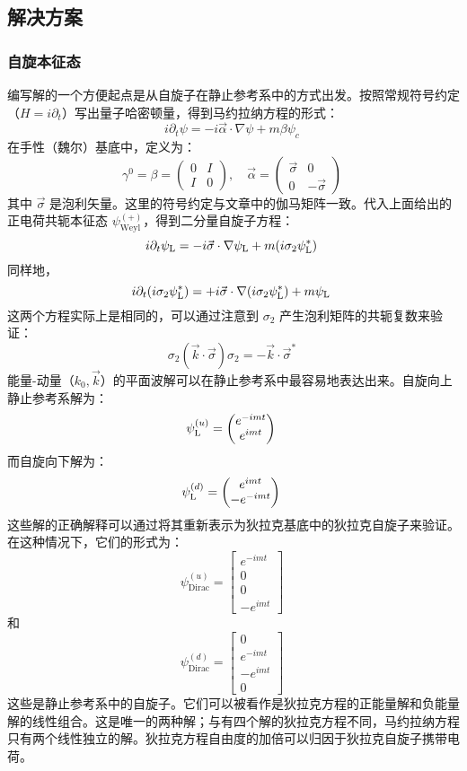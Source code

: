 \subsection{解决方案}  
\subsubsection{自旋本征态}  
编写解的一个方便起点是从自旋子在静止参考系中的方式出发。按照常规符号约定（\( H = i \partial_t \)）写出量子哈密顿量，得到马约拉纳方程的形式：
\[
i \partial_t \psi = -i \vec{\alpha} \cdot \nabla \psi + m \beta \psi_c~
\]
在手性（魏尔）基底中，定义为：
\[
\gamma^0 = \beta = \begin{pmatrix} 0 & I \\ I & 0 \end{pmatrix}, \quad \vec{\alpha} = \begin{pmatrix} \vec{\sigma} & 0 \\ 0 & -\vec{\sigma} \end{pmatrix}~
\]
其中 \(\vec{\sigma}\) 是泡利矢量。这里的符号约定与文章中的伽马矩阵一致。代入上面给出的正电荷共轭本征态 \( \psi_{\text{Weyl}}^{(+)} \)，得到二分量自旋子方程：
\[
i \partial_t \psi_{\rm L} = -i \vec{\sigma} \cdot \nabla \psi_{\rm L} + m (i \sigma_2 \psi_{\rm L}^*)~
\]
同样地，
\[
i \partial_t (i \sigma_2 \psi_{\rm L}^*) = +i \vec{\sigma} \cdot \nabla (i \sigma_2 \psi_{\rm L}^*) + m \psi_{\rm L}~
\]
这两个方程实际上是相同的，可以通过注意到 \( \sigma_2 \) 产生泡利矩阵的共轭复数来验证：
\[
\sigma_2 (\vec{k} \cdot \vec{\sigma}) \sigma_2 = -\vec{k} \cdot \vec{\sigma}^*~
\]
能量-动量（\(k_0, \vec{k}\)）的平面波解可以在静止参考系中最容易地表达出来。自旋向上静止参考系解为：
\[
\psi_{\rm L}^{(u)} = \begin{pmatrix} e^{-imt} \\ e^{imt} \end{pmatrix}~
\]
而自旋向下解为：
\[
\psi_{\rm L}^{(d)} = \begin{pmatrix} e^{imt} \\ -e^{-imt} \end{pmatrix}~
\]
这些解的正确解释可以通过将其重新表示为狄拉克基底中的狄拉克自旋子来验证。在这种情况下，它们的形式为：
\[
\psi_{\text{Dirac}}^{(u)} = \begin{bmatrix} e^{-imt} \\ 0 \\ 0 \\ -e^{imt} \end{bmatrix}~
\]
和
\[
\psi_{\text{Dirac}}^{(d)} = \begin{bmatrix} 0 \\ e^{-imt} \\ -e^{imt} \\ 0 \end{bmatrix}~
\]
这些是静止参考系中的自旋子。它们可以被看作是狄拉克方程的正能量解和负能量解的线性组合。这是唯一的两种解；与有四个解的狄拉克方程不同，马约拉纳方程只有两个线性独立的解。狄拉克方程自由度的加倍可以归因于狄拉克自旋子携带电荷。
